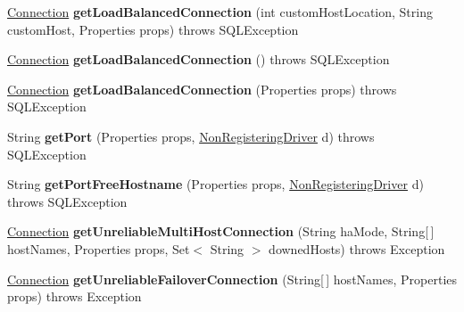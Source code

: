 \begin{DoxyCompactItemize}
\mbox{\label{classtestsuite_1_1_base_test_case_ad6cc6fb4e11a39397721138337a9a099}} 
\mbox{\hyperlink{interfacecom_1_1mysql_1_1jdbc_1_1_connection}{Connection}} {\bfseries get\+Load\+Balanced\+Connection} (int custom\+Host\+Location, String custom\+Host, Properties props)  throws S\+Q\+L\+Exception 
\item 
\mbox{\label{classtestsuite_1_1_base_test_case_aab97786f4a33c78651b4bae1898c9839}} 
\mbox{\hyperlink{interfacecom_1_1mysql_1_1jdbc_1_1_connection}{Connection}} {\bfseries get\+Load\+Balanced\+Connection} ()  throws S\+Q\+L\+Exception 
\item 
\mbox{\label{classtestsuite_1_1_base_test_case_add047612e662b6cc0f4798f7a196050b}} 
\mbox{\hyperlink{interfacecom_1_1mysql_1_1jdbc_1_1_connection}{Connection}} {\bfseries get\+Load\+Balanced\+Connection} (Properties props)  throws S\+Q\+L\+Exception 
\item 
\mbox{\label{classtestsuite_1_1_base_test_case_a417f5b5bd61fcf317f9c35c892a2a173}} 
String {\bfseries get\+Port} (Properties props, \mbox{\hyperlink{classcom_1_1mysql_1_1jdbc_1_1_non_registering_driver}{Non\+Registering\+Driver}} d)  throws S\+Q\+L\+Exception 
\item 
\mbox{\label{classtestsuite_1_1_base_test_case_aa33289cf35fc9d325b815c6386586d38}} 
String {\bfseries get\+Port\+Free\+Hostname} (Properties props, \mbox{\hyperlink{classcom_1_1mysql_1_1jdbc_1_1_non_registering_driver}{Non\+Registering\+Driver}} d)  throws S\+Q\+L\+Exception 
\item 
\mbox{\label{classtestsuite_1_1_base_test_case_af5d756474dc2a76bef281fc884529658}} 
\mbox{\hyperlink{interfacecom_1_1mysql_1_1jdbc_1_1_connection}{Connection}} {\bfseries get\+Unreliable\+Multi\+Host\+Connection} (String ha\+Mode, String\mbox{[}$\,$\mbox{]} host\+Names, Properties props, Set$<$ String $>$ downed\+Hosts)  throws Exception 
\item 
\mbox{\label{classtestsuite_1_1_base_test_case_af564d6c77d426f7c2fbd614c4e8843f5}} 
\mbox{\hyperlink{interfacecom_1_1mysql_1_1jdbc_1_1_connection}{Connection}} {\bfseries get\+Unreliable\+Failover\+Connection} (String\mbox{[}$\,$\mbox{]} host\+Names, Properties props)  throws Exception 

\end{DoxyCompactItemize}
